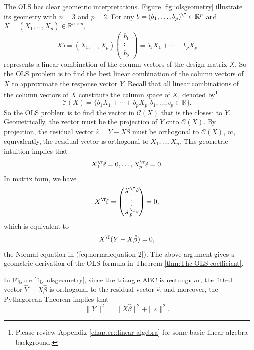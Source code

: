 The OLS has clear geometric interpretations. Figure \ref{fig::olsgeometry} illustrate its geometry with $n=3$ and $p=2$. 
For any $b=(b_{1},\ldots,b_{p})^{\T}\in\mathbb{R}^{p}$ and $X=(X_{1},\ldots,X_{p})\in\mathbb{R}^{n\times p}$,
$$
Xb
=(X_{1},\ldots,X_{p}) \begin{pmatrix}
b_1\\
\vdots \\
b_p
\end{pmatrix}
=b_{1}X_{1}+\cdots+b_{p}X_{p}
$$ 
represents a linear combination
of the column vectors of the design matrix $X$. So the OLS problem
is to find the best linear combination of the column vectors of $X$
to approximate the response vector $Y$. Recall that all linear combinations
of the column vectors of $X$ constitute the column space of $X$,
denoted by\footnote{Please review Appendix \ref{chapter::linear-algebra} for some basic linear algebra background.} 
$$
\mathcal{C}(X) = \{  b_{1}X_{1}+\cdots+b_{p}X_{p} : b_1, \ldots, b_p \in  \mathbb{R}   \}.
$$
So the OLS problem is to find the vector
in $\mathcal{C}(X)$ that is the closest to $Y$. Geometrically, the vector
must be the projection of $Y$ onto $\mathcal{C}(X).$ By projection,
the residual vector $\hat{\varepsilon}=Y-X\hat{\beta}$ must be orthogonal
to $\mathcal{C}(X)$, or, equivalently, the residual
vector is orthogonal to $X_{1},\ldots,X_{p}$. This geometric intuition implies that
$$
X_{1}^{\T} \hat{\varepsilon} =0,\ldots,X_{p}^{\T}  \hat{\varepsilon} =0 .
$$
In matrix form, we have 
$$
 X^{\T} \hat{\varepsilon}
= \begin{pmatrix}
X_1^{\T} \hat{\varepsilon} \\
\vdots \\
X_p^{\T}\hat{\varepsilon}
\end{pmatrix}
=0,
$$
which is equivalent to
$$
 X^{\T} (Y-X\hat{\beta}) = 0 ,
$$
the Normal equation in (\ref{eq:normalequation-2}). 
The above argument gives a geometric derivation of the OLS formula
in Theorem \ref{thm:The-OLS-coefficient}. 



In Figure \ref{fig::olsgeometry}, since the triangle ABC is rectangular, the fitted vector $\hat{Y} = X\hat{\beta}$ is orthogonal to the residual vector $\hat{\varepsilon}$, and moreover, the Pythagorean Theorem implies that
$$
\| Y\|^2 = \| X\hat{\beta} \|^2 + \| \hat{\varepsilon} \|^2.
$$





